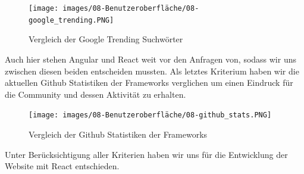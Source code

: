 \begin{figure}[hbt!]%
  \centering
  \texttt{[image: images/08-Benutzeroberfläche/08-google\_trending.PNG]}
  \caption{Vergleich der Google Trending Suchwörter}%
\end{figure}

Auch hier stehen Angular und React weit vor den Anfragen von, sodass wir uns zwischen diesen beiden entscheiden mussten. Als letztes Kriterium haben wir die aktuellen Github Statistiken der Frameworks verglichen um einen Eindruck für die Community und dessen Aktivität zu erhalten.

\begin{figure}[hbt!]%
\centering
  \texttt{[image: images/08-Benutzeroberfläche/08-github\_stats.PNG]}
  \caption{Vergleich der Github Statistiken der Frameworks}%
\end{figure}

Unter Berücksichtigung aller Kriterien haben wir uns für die Entwicklung der Website mit React entschieden.